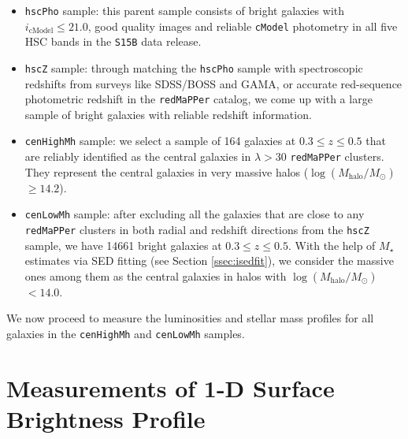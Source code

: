 \documentclass[a4paper,fleqn,usenatbib]{mnras}
\def\redm{\texttt{redMaPPer}}
\def\rbcg{\texttt{cenHighMh}}
\def\nbcg{\texttt{cenLowMh}}
\def\mstar{{$M_{\star}$}}
\def\logmh{{$\log (M_{\mathrm{halo}}/M_{\odot})$}}
\begin{document}
    \begin{itemize}
        \item \texttt{hscPho} sample: this parent sample consists of bright galaxies 
            with $i_{\mathrm{cModel}} \leq 21.0$, good quality images and reliable 
            \texttt{cModel} photometry in all five HSC bands in the \texttt{S15B} 
            data release. 
        \item \texttt{hscZ} sample: through matching the \texttt{hscPho} sample with 
            spectroscopic redshifts from surveys like SDSS/BOSS and GAMA, or accurate 
            red-sequence photometric redshift in the \redm{} catalog, we come up with 
            a large sample of bright galaxies with reliable redshift information. 
        \item \rbcg{} sample: we select a sample of 164 galaxies at 
            $0.3 \leq z \leq 0.5$ that are reliably identified as the central galaxies 
            in $\lambda > 30$ \redm{} clusters. 
            They represent the central galaxies in very massive halos 
            (\logmh{}$\geq 14.2$). 
        \item \nbcg{} sample: after excluding all the galaxies that are close to any 
            \redm{} clusters in both radial and redshift directions from the 
            \texttt{hscZ} sample, we have 14661 bright galaxies at 
            $0.3 \leq z \leq 0.5$.
            With the help of \mstar{} estimates via SED fitting (see Section 
            \ref{ssec:isedfit}), we consider the massive ones among them as the 
            central galaxies in halos with \logmh{}$<14.0$.  
    \end{itemize}
    
    We now proceed to measure the luminosities and stellar mass profiles for 
    all galaxies in the \rbcg{} and \nbcg{} samples.

\section{Measurements of 1-D Surface Brightness Profile}
    \label{sec:ellipse}
    
\end{document}
